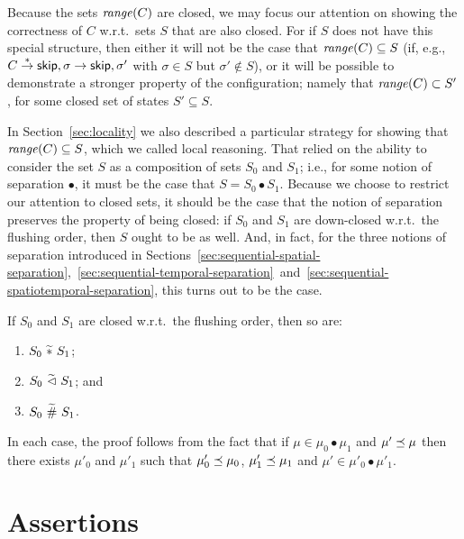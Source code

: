 \documentclass[11pt]{report}
\begin{document}
Because the sets $\mathit{range}(C)$ are closed, we may focus our attention on showing the correctness of $C$ w.r.t.\ sets $S$ that are also closed. For if $S$ does not have this special structure, then either it will not be the case that $\mathit{range}(C) \subseteq S$ (if, e.g., $C \stackrel{\ast}{\rightarrow} \operatorname{\mathsf{skip}},\sigma \rightarrow \operatorname{\mathsf{skip}},\sigma'$ with $\sigma \in S$ but $\sigma' \notin S$), or it will be possible to demonstrate a stronger property of the configuration; namely that $\mathit{range}(C) \subset S'$, for some closed set of states $S' \subseteq S$. 

In Section~\ref{sec:locality} we also described a particular strategy for showing that $\mathit{range}(C) \subseteq S$, which we called local reasoning. That relied on the ability to consider the set $S$ as a composition of sets $S_0$ and $S_1$; i.e., for some notion of separation $\bullet$, it must be the case that $S = S_0 \bullet S_1$. Because we choose to restrict our attention to closed sets, it should be the case that the notion of separation preserves the property of being closed: if $S_0$ and $S_1$ are down-closed w.r.t.\ the flushing order, then $S$ ought to be as well. And, in fact, for the three notions of separation introduced in Sections~\ref{sec:sequential-spatial-separation},~\ref{sec:sequential-temporal-separation}~and~\ref{sec:sequential-spatiotemporal-separation}, this turns out to be the case. 
\begin{lemma}
    \label{lem:separation-preserves-closure}    
    If $S_0$ and $S_1$ are closed w.r.t.\ the flushing order, then so are: 
    \begin{enumerate}
        \item $S_0 \operatorname{\,\widetilde{\ast}\,} S_1$; 
        \item $S_0 \operatorname{\,\widetilde{\vartriangleleft}\,} S_1$; and 
        \item $S_0 \operatorname{\,\widetilde{\#}\,} S_1$.
    \end{enumerate}
\end{lemma}

In each case, the proof follows from the fact that if $\mu \in \mu_0 \bullet \mu_1$ and $\mu' \preceq \mu$ then there exists $\mu'_0$ and $\mu'_1$ such that $\mu'_0 \preceq \mu_0$, $\mu'_1 \preceq \mu_1$ and $\mu' \in \mu'_0 \bullet \mu'_1$. 

\section{Assertions}
\label{sec:uniprocessor-assertions}
\end{document}
